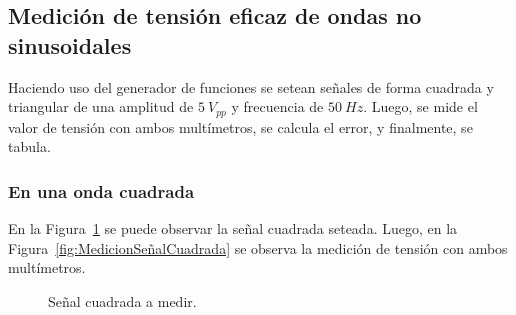   \subsection{Medición de tensión eficaz de ondas no sinusoidales}
    Haciendo uso del generador de funciones se setean señales de forma cuadrada y
    triangular de una amplitud de $5~V_{pp}$ y frecuencia de $50~Hz$. Luego, se 
    mide el valor de tensión con ambos multímetros, se calcula el error, y finalmente,
    se tabula.

    \subsubsection{En una onda cuadrada}
      En la Figura~\ref{fig:SeñalCuadrada} se puede observar la señal cuadrada seteada.
      Luego, en la Figura~\ref{fig:MedicionSeñalCuadrada} se observa la medición de tensión
      con ambos multímetros.

      \begin{figure}[H]
        \centering
        \caption{Señal cuadrada a medir.}
        \label{fig:SeñalCuadrada}
      \end{figure}

